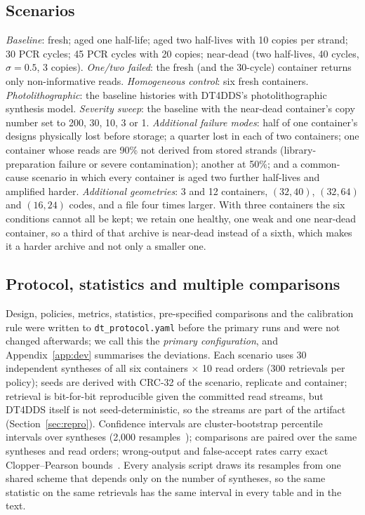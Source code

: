 \documentclass[conference,onecolumn,11pt]{IEEEtran}
\begin{document}
\subsection{Scenarios}
\emph{Baseline}: fresh; aged one half-life; aged two half-lives with 10 copies per strand; 30
PCR cycles; 45 PCR cycles with 20 copies; near-dead (two half-lives, 40 cycles, $\sigma{=}0.5$,
3 copies).  \emph{One/two failed}: the fresh (and the 30-cycle) container returns only
non-informative reads.  \emph{Homogeneous control}: six fresh containers.
\emph{Photolithographic}: the baseline histories with DT4DDS's photolithographic synthesis
model.  \emph{Severity sweep}: the baseline with the near-dead container's copy number set to 200, 30, 10, 3
or 1.  \emph{Additional failure modes}: half of one container's designs physically lost before storage;
a quarter lost in each of two containers; one container whose reads are 90\% not derived from stored
strands (library-preparation failure or severe contamination); another at 50\%; and a common-cause
scenario in which every container is aged two further half-lives and amplified harder.
\emph{Additional geometries}: 3 and 12 containers, $(32,40)$, $(32,64)$ and $(16,24)$ codes, and a file
four times larger.  With three containers the six conditions cannot all be kept; we retain one healthy,
one weak and one near-dead container, so a third of that archive is near-dead instead of a sixth, which
makes it a harder archive and not only a smaller one.

\subsection{Protocol, statistics and multiple comparisons}\label{sec:eval-stats}
Design, policies, metrics, statistics, pre-specified comparisons and the calibration rule were written to
\texttt{dt\_protocol.yaml} before the primary runs and were not changed afterwards; we call this the
\emph{primary configuration}, and Appendix~\ref{app:dev} summarises the deviations.  Each scenario uses
30 independent syntheses of all six containers $\times$ 10 read orders (300 retrievals per policy); seeds
are derived with CRC-32 of the scenario, replicate and container; retrieval is bit-for-bit reproducible
given the committed read streams, but DT4DDS itself is not seed-deterministic, so the streams are part of
the artifact (Section~\ref{sec:repro}).  Confidence intervals are cluster-bootstrap percentile intervals
over syntheses (2{,}000 resamples~\cite{efron1993introduction}); comparisons are paired over the same
syntheses and read orders; wrong-output and false-accept rates carry exact Clopper--Pearson
bounds~\cite{clopper1934use}.  Every analysis script draws its resamples from one shared scheme that
depends only on the number of syntheses, so the same statistic on the same retrievals has the same
interval in every table and in the text.
\end{document}
